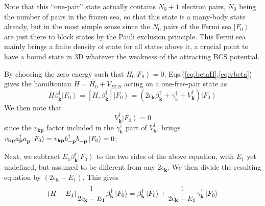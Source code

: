 \documentclass[epj]{svjour}
\newcommand{\vk}{\ensuremath{\mathbf{k}}}
\begin{document}
 Note that this ``one-pair'' state actually contains $N_0+1$ electron pairs, 
$N_0$ being the number of pairs in the frozen sea, so that this state is a many-body state already, but in the most simple sense since the $N_0$ pairs of the Fermi sea $%
\left|F_0\right> $ are just there to block states by the Pauli exclusion
principle. This Fermi sea mainly brings a finite density of state for all
states above it, a crucial point to have a bound state in 3D whatever the weakness of the attracting BCS potential.

By choosing the zero energy such
that $H_0\left|F_0\right> =0$, Eqs.(\ref{eq:betaH},\ref{eq:vbeta}) gives the hamiltonian $H=H_0+V_{BCS}$
acting on a one-free-pair state as 
\begin{equation}
H\beta^{\dagger}_\vk\left|F_0\right>  =\left[H,\beta^{\dagger}_\vk\right] 
\left|F_0\right> 
=\left(2\epsilon_\vk\beta^{\dagger}_\vk+\gamma^{\dagger}_\vk+V^{\dagger}_\vk%
\right) \left|F_0\right>  
\end{equation}
We then note that 
\begin{equation}\label{eq:Vk0}
V^{\dagger}_\vk\left|F_0\right> =0
\end{equation}
since the $v_{\mathbf{k} \mathbf{p} }$ factor included
in the $\gamma^{\dagger}_{\mathbf{k} }$ part of $V^{\dagger}_\vk$,  brings
 $v_{\mathbf{k} \mathbf{p} }a^{\dagger}_{\mathbf{p} }a^{}_{%
\mathbf{p} }\left|F_0\right>=v_{\mathbf{k} \mathbf{p} }b^{\dagger}_{-\mathbf{p} }b^{}_{-\mathbf{p} }\left|F_0\right>=0$;
 
Next, we subtract $E _1\beta^{\dagger}_\vk\left|F_0\right>  $ to
the two sides of the above equation, with $E_1$ yet undefined, but assumed to be different from any $2\epsilon_{\mathbf{k}}$.  We then divide the resulting equation by $%
\left(2\epsilon_\vk-E _1\right) $.  This gives
\begin{equation}  \label{eq:HE1}
 (H-E_1)\frac{1}{2\epsilon_\vk-E _1} \beta^{\dagger}_\vk%
\left|F_0\right>  =\beta^{\dagger}_\vk\left|F_0\right>  +\frac{1}{%
2\epsilon_\vk-E _1} \gamma^{\dagger}_\vk\left|F_0\right>  
\end{equation}
\end{document}
